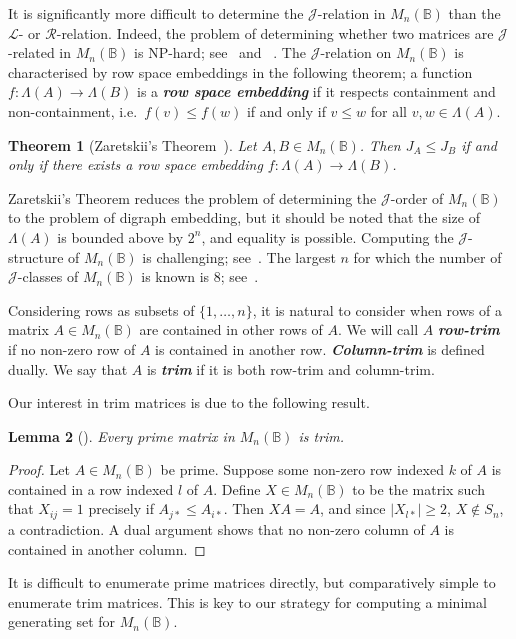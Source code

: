 \documentclass[11pt]{article}
\newtheorem{thm}{Theorem}[subsection]
\newtheorem{lemma}[thm]{Lemma}
\newcommand{\defn}[1]{\textbf{\textit{#1}}}
\numberwithin{equation}{section}
\renewcommand{\to}{\longrightarrow}
\newcommand{\B}{\mathbb{B}}
\newcommand{\Bn}{M_n(\B)}
\renewcommand{\L}{\mathscr{L}}
\newcommand{\R}{\mathscr{R}}
\newcommand{\J}{\mathscr{J}}
\newcommand{\RowS}{\Lambda}
\begin{document}
It is significantly more difficult to determine the $\J$-relation in $\Bn$ than
the $\L$- or $\R$-relation. Indeed, the problem of determining whether two
matrices are $\J$-related in $\Bn$ is NP-hard; see~\cite[Theorem 2.7]{Fenner2018ab}
and ~\cite{Markowsky1992aa}.
The $\J$-relation on $\Bn$ is characterised by row space embeddings in the
following theorem; a function $f: \RowS(A) \to \RowS(B)$ is a \defn{row space
  embedding} if it respects containment and non-containment, i.e.\ $f(v) \leq
f(w)$ if and only if $v \leq w$ for all $v, w \in \RowS(A)$.
\begin{thm}[Zaretskii's Theorem~\cite{Zaretskii1963aa}]
  Let $A, B \in \Bn$. Then $J_A \leq J_B$ if and only if there exists a row
  space embedding $f: \RowS(A) \to \RowS(B)$.
\end{thm}
Zaretskii's Theorem reduces the problem of determining the $\J$-order of $\Bn$
to the problem of digraph embedding, but it should be noted that the size of
$\RowS(A)$ is bounded above by $2^n$, and equality is possible. Computing the
$\J$-structure of $\Bn$ is challenging; see~\cite{Breen1997aa}. The largest $n$
for which the number of $\J$-classes of $\Bn$ is known is $8$;
see~\cite{Breen2001aa}.

Considering rows as subsets of $\{1, \ldots, n\}$, it is natural to consider
when rows of a matrix $A \in \Bn$ are contained in other rows of $A$. We will
call $A$ \defn{row-trim} if no non-zero row of $A$ is contained in another row.
\defn{Column-trim} is defined dually. We say that $A$ is \defn{trim} if it is
both row-trim and column-trim.

Our interest in trim matrices is due to the following result.

\begin{lemma}[{\cite[Lemma 3.1]{Konieczny2011aa}}]
  Every prime matrix in $\Bn$ is trim.
\end{lemma}
\begin{proof}
  Let $A \in \Bn$ be prime. Suppose some non-zero row indexed $k$ of $A$ is
  contained in a row indexed $l$ of $A$. Define $X \in \Bn$ to be the matrix
  such that $X_{ij} = 1$ precisely if $A_{j*} \leq A_{i*}$. Then $XA = A$, and
  since $|X_{l*}| \geq 2$, $X \not\in S_n$, a contradiction. A dual argument
  shows that no non-zero column of $A$ is contained in another column.
\end{proof}

It is difficult to enumerate prime matrices directly, but comparatively simple
to enumerate trim matrices. This is key to our strategy for computing a minimal
generating set for $\Bn$.
\end{document}
